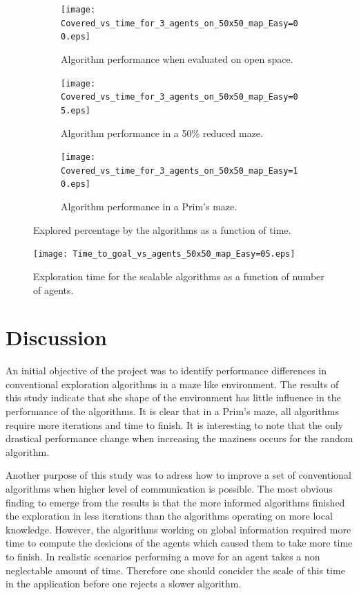 \documentclass{article}
\begin{document}
\begin{figure}[H]
    \centering
    \begin{subfigure}[b]{0.45\textwidth}
        \texttt{[image: Covered\_vs\_time\_for\_3\_agents\_on\_50x50\_map\_Easy=00.eps]}
        \caption{ Algorithm performance when evaluated on open space.}
    \end{subfigure}
    \begin{subfigure}[b]{0.45\textwidth}
        \texttt{[image: Covered\_vs\_time\_for\_3\_agents\_on\_50x50\_map\_Easy=05.eps]}
        \caption{ Algorithm performance in a 50\% reduced maze. }
    \end{subfigure}

    \begin{subfigure}[b]{0.45\textwidth}
        \texttt{[image: Covered\_vs\_time\_for\_3\_agents\_on\_50x50\_map\_Easy=10.eps]}
        \caption{ Algorithm performance in a Prim's maze. }
    \end{subfigure}
    
    \caption{Explored percentage by the algorithms as a function of
      time.}
    \label{fig:perf_time}
\end{figure}

\begin{figure}[H]
  \centering
      \texttt{[image: Time\_to\_goal\_vs\_agents\_50x50\_map\_Easy=05.eps]}
  \caption{Exploration time for the scalable algorithms as a function of number
    of agents.}
  \label{fig:scale}
\end{figure}

\section{Discussion}

An initial objective of the project was to identify performance differences in
conventional exploration algorithms in a maze like environment. The results of
this study indicate that she shape of the environment has little influence in
the performance of the algorithms. It is clear that in a Prim's maze, all
algorithms require more iterations and time to finish. It is interesting to note
that the only drastical performance change when increasing the maziness occurs
for the random algorithm.

Another purpose of this study was to adress how to improve a set of conventional
algorithms when higher level of communication is possible. The most obvious
finding to emerge from the results is that the more informed algorithms finished
the exploration in less iterations than the algorithms operating on more local
knowledge. However, the algorithms working on global information required more
time to compute the desicions of the agents which caused them to take more time
to finish. In realistic scenarios performing a move for an agent takes a non
neglectable amount of time. Therefore one should concider the scale of this time
in the application before one rejects a slower algorithm.
\end{document}
